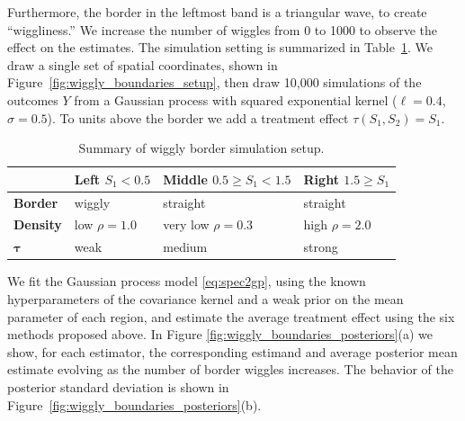 \documentclass[letter,12pt]{article}
\newcommand{\taubold}{\bm{\tau}}
\begin{document}
Furthermore, the border in the leftmost band is a triangular wave, to create ``wiggliness.''
We increase the number of wiggles from 0 to 1000 to observe the effect on the estimates.
The simulation setting is summarized in Table~\ref{table:wiggly_setup}.
We draw a single set of spatial coordinates, shown in Figure~\ref{fig:wiggly_boundaries_setup}, then draw 10,000 simulations of the outcomes \(Y\) from a Gaussian process with squared exponential kernel (\(\ell=0.4\), \(\sigma=0.5\)).
To units above the border we add a treatment effect \(\tau(S_1, S_2) = S_1\).



\begin{table}[tbp]
\centering
\begin{tabular}{llll}
\hline
& Left \(S_1< 0.5\) & Middle \(0.5 \ge S_1 < 1.5\) & Right \(1.5 \ge S_1\)\tabularnewline
\hline
\textbf{Border} & wiggly & straight & straight\tabularnewline
\textbf{Density} & low \(\rho=1.0\) & very low \(\rho=0.3\) & high \(\rho=2.0\)\tabularnewline
\(\taubold\) & weak & medium & strong\tabularnewline
\hline
\end{tabular}
\caption{Summary of wiggly border simulation setup. \label{table:wiggly_setup}}
\end{table}

        We fit the Gaussian process model \eqref{eq:spec2gp},
using the known hyperparameters of the covariance kernel and a weak prior on the mean parameter of each region,
and estimate the average treatment effect using the six methods proposed above.
In Figure \ref{fig:wiggly_boundaries_posteriors}(a) we show, for each estimator, the corresponding estimand and average posterior mean estimate evolving as the number of border wiggles increases.
The behavior of the posterior standard deviation is shown in Figure~\ref{fig:wiggly_boundaries_posteriors}(b).
\end{document}
